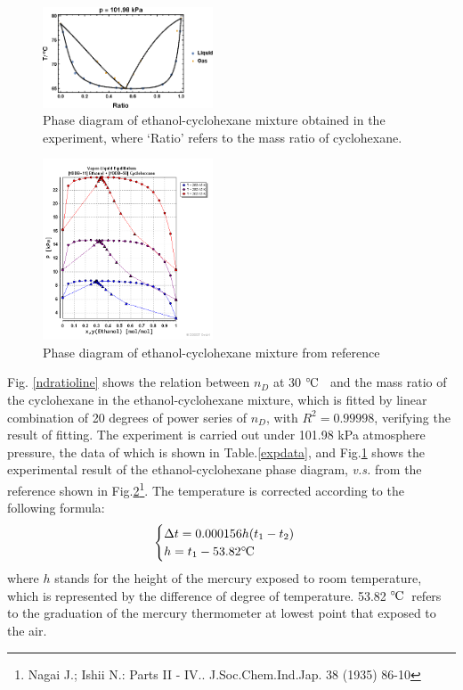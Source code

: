 \documentclass[%
 reprint,
 amsmath,amssymb,
 aps,
10.5pt,
]{revtex4-1}
\newcommand{\celsius}{\ensuremath{^\circ\hspace{-0.09em}\mathrm{C}}}
\begin{document}
\begin{figure}
\centering
\includegraphics[width=0.45\textwidth]{figures/phasediagram.eps}
\caption{Phase diagram of ethanol-cyclohexane mixture obtained in the experiment, where `Ratio' refers to the mass ratio of cyclohexane.}
\label{phasediagram}
\end{figure}

\begin{figure}
\centering
\includegraphics[width=0.45\textwidth]{figures/ECPhaseRef.png}
\caption{Phase diagram of ethanol-cyclohexane mixture from reference}
\label{phasediagramref}
\end{figure}

Fig. \ref{ndratioline} shows the relation between $n_D$ at 30 \celsius~ and the mass ratio of the cyclohexane in the ethanol-cyclohexane mixture, which is fitted by linear combination of 20 degrees of power series of $n_D$, with $R^2 = 0.99998$, verifying the result of fitting. The experiment is carried out under 101.98 kPa atmosphere pressure, the data of which is shown in Table.\ref{expdata}, and Fig.\ref{phasediagram} shows the experimental result of the ethanol-cyclohexane phase diagram, \emph{v.s.} from the reference shown in Fig.\ref{phasediagramref}\footnote{Nagai J.; Ishii N.: Parts II - IV.. J.Soc.Chem.Ind.Jap. 38 (1935) 86-10
}. The temperature is corrected according to the following formula:
\begin{equation}
\begin{cases}
\Delta t = 0.000156 h (t_1 - t_2) \\
h = t_1 - 53.82 \celsius
\end{cases}
\end{equation}
where $h$ stands for the height of the mercury exposed to room temperature, which is represented by the difference of degree of temperature. 53.82 \celsius ~refers to the graduation of the mercury thermometer at lowest point that exposed to the air.
\end{document}
